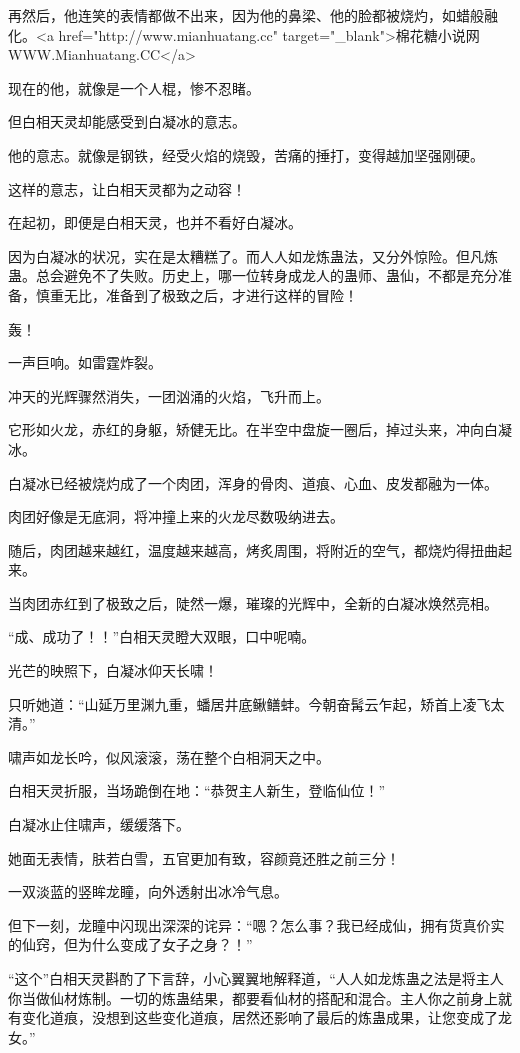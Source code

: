 \begin{this_body}
再然后，他连笑的表情都做不出来，因为他的鼻梁、他的脸都被烧灼，如蜡般融化。<a href="http://www.mianhuatang.cc" target="\_blank">棉花糖小说网WWW.Mianhuatang.CC</a>

现在的他，就像是一个人棍，惨不忍睹。

但白相天灵却能感受到白凝冰的意志。

他的意志。就像是钢铁，经受火焰的烧毁，苦痛的捶打，变得越加坚强刚硬。

这样的意志，让白相天灵都为之动容！

在起初，即便是白相天灵，也并不看好白凝冰。

因为白凝冰的状况，实在是太糟糕了。而人人如龙炼蛊法，又分外惊险。但凡炼蛊。总会避免不了失败。历史上，哪一位转身成龙人的蛊师、蛊仙，不都是充分准备，慎重无比，准备到了极致之后，才进行这样的冒险！

轰！

一声巨响。如雷霆炸裂。

冲天的光辉骤然消失，一团汹涌的火焰，飞升而上。

它形如火龙，赤红的身躯，矫健无比。在半空中盘旋一圈后，掉过头来，冲向白凝冰。

白凝冰已经被烧灼成了一个肉团，浑身的骨肉、道痕、心血、皮发都融为一体。

肉团好像是无底洞，将冲撞上来的火龙尽数吸纳进去。

随后，肉团越来越红，温度越来越高，烤炙周围，将附近的空气，都烧灼得扭曲起来。

当肉团赤红到了极致之后，陡然一爆，璀璨的光辉中，全新的白凝冰焕然亮相。

“成、成功了！！”白相天灵瞪大双眼，口中呢喃。

光芒的映照下，白凝冰仰天长啸！

只听她道：“山延万里渊九重，蟠居井底鳅鳝蚌。今朝奋髯云乍起，矫首上凌飞太清。”

啸声如龙长吟，似风滚滚，荡在整个白相洞天之中。

白相天灵折服，当场跪倒在地：“恭贺主人新生，登临仙位！”

白凝冰止住啸声，缓缓落下。

她面无表情，肤若白雪，五官更加有致，容颜竟还胜之前三分！

一双淡蓝的竖眸龙瞳，向外透射出冰冷气息。

但下一刻，龙瞳中闪现出深深的诧异：“嗯？怎么事？我已经成仙，拥有货真价实的仙窍，但为什么变成了女子之身？！”

“这个”白相天灵斟酌了下言辞，小心翼翼地解释道，“人人如龙炼蛊之法是将主人你当做仙材炼制。一切的炼蛊结果，都要看仙材的搭配和混合。主人你之前身上就有变化道痕，没想到这些变化道痕，居然还影响了最后的炼蛊成果，让您变成了龙女。”


\end{this_body}
